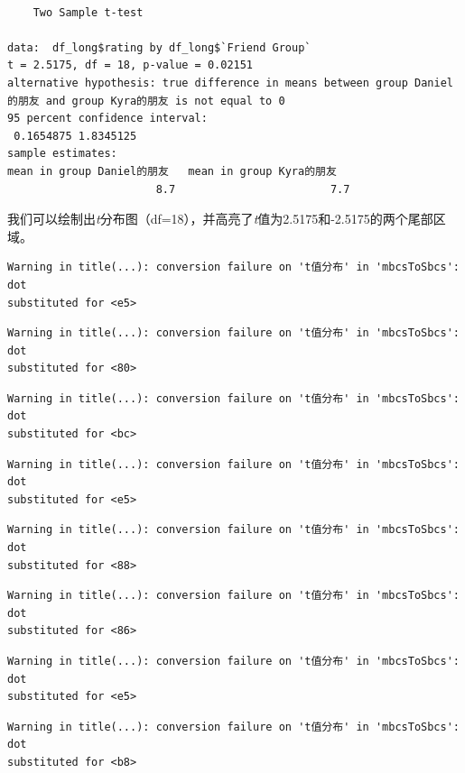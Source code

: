\documentclass[
  letterpaper,
  DIV=11,
  numbers=noendperiod]{scrreprt}
\begin{document}
\begin{verbatim}

    Two Sample t-test

data:  df_long$rating by df_long$`Friend Group`
t = 2.5175, df = 18, p-value = 0.02151
alternative hypothesis: true difference in means between group Daniel的朋友 and group Kyra的朋友 is not equal to 0
95 percent confidence interval:
 0.1654875 1.8345125
sample estimates:
mean in group Daniel的朋友   mean in group Kyra的朋友 
                       8.7                        7.7 
\end{verbatim}

我们可以绘制出\emph{t}分布图（df=18），并高亮了\emph{t}值为2.5175和-2.5175的两个尾部区域。

\begin{verbatim}
Warning in title(...): conversion failure on 't值分布' in 'mbcsToSbcs': dot
substituted for <e5>
\end{verbatim}

\begin{verbatim}
Warning in title(...): conversion failure on 't值分布' in 'mbcsToSbcs': dot
substituted for <80>
\end{verbatim}

\begin{verbatim}
Warning in title(...): conversion failure on 't值分布' in 'mbcsToSbcs': dot
substituted for <bc>
\end{verbatim}

\begin{verbatim}
Warning in title(...): conversion failure on 't值分布' in 'mbcsToSbcs': dot
substituted for <e5>
\end{verbatim}

\begin{verbatim}
Warning in title(...): conversion failure on 't值分布' in 'mbcsToSbcs': dot
substituted for <88>
\end{verbatim}

\begin{verbatim}
Warning in title(...): conversion failure on 't值分布' in 'mbcsToSbcs': dot
substituted for <86>
\end{verbatim}

\begin{verbatim}
Warning in title(...): conversion failure on 't值分布' in 'mbcsToSbcs': dot
substituted for <e5>
\end{verbatim}

\begin{verbatim}
Warning in title(...): conversion failure on 't值分布' in 'mbcsToSbcs': dot
substituted for <b8>
\end{verbatim}
\end{document}
